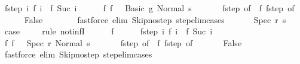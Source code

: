 \begin{isabellebody}
\ f{\isacharunderscore}step{\isacharcolon}\ {\isachardoublequoteopen}{\isasymAnd}i{\isachardot}\ {\isasymGamma}{\isasymturnstile}f\ i\ {\isasymrightarrow}\ f\ {\isacharparenleft}Suc\ i{\isacharparenright}{\isachardoublequoteclose}\isanewline
\ \ \ \ \isamarkupfalse%
\ f{\isacharunderscore}{}{\isacharcolon}\ {\isachardoublequoteopen}f\ {}\ {\isacharequal}\ {\isacharparenleft}Basic\ g{\isacharcomma}\ Normal\ s{\isacharparenright}{\isachardoublequoteclose}\ \isanewline
\ \ \ \ \isamarkupfalse%
\ f{\isacharunderscore}step\ {\isacharbrackleft}of\ {}{\isacharbrackright}\ f{\isacharunderscore}{}\ f{\isacharunderscore}step\ {\isacharbrackleft}of\ {}{\isacharbrackright}\isanewline
\ \ \ \ \isamarkupfalse%
\ False\isanewline
\ \ \ \ \ \ \isamarkupfalse%
\ {\isacharparenleft}fastforce\ elim{\isacharcolon}\ Skip{\isacharunderscore}no{\isacharunderscore}step\ step{\isacharunderscore}elim{\isacharunderscore}cases{\isacharparenright}\isanewline
\ \ \isamarkupfalse%
\isanewline
{}\isamarkupfalse%
\isanewline
\ \ \isamarkupfalse%
\ {\isacharparenleft}Spec\ r\ s{\isacharparenright}\ \isanewline
\ \ \isamarkupfalse%
\ {\isacharquery}case\ \isanewline
\ \ \isamarkupfalse%
\ {\isacharparenleft}rule\ not{\isacharunderscore}infI{\isacharparenright}\isanewline
\ \ \ \ \isamarkupfalse%
\ f\isanewline
\ \ \ \ \isamarkupfalse%
\ f{\isacharunderscore}step{\isacharcolon}\ {\isachardoublequoteopen}{\isasymAnd}i{\isachardot}\ {\isasymGamma}{\isasymturnstile}f\ i\ {\isasymrightarrow}\ f\ {\isacharparenleft}Suc\ i{\isacharparenright}{\isachardoublequoteclose}\isanewline
\ \ \ \ \isamarkupfalse%
\ f{\isacharunderscore}{}{\isacharcolon}\ {\isachardoublequoteopen}f\ {}\ {\isacharequal}\ {\isacharparenleft}Spec\ r{\isacharcomma}\ Normal\ s{\isacharparenright}{\isachardoublequoteclose}\ \isanewline
\ \ \ \ \isamarkupfalse%
\ f{\isacharunderscore}step\ {\isacharbrackleft}of\ {}{\isacharbrackright}\ f{\isacharunderscore}{}\ f{\isacharunderscore}step\ {\isacharbrackleft}of\ {}{\isacharbrackright}\isanewline
\ \ \ \ \isamarkupfalse%
\ False\isanewline
\ \ \ \ \ \ \isamarkupfalse%
\ {\isacharparenleft}fastforce\ elim{\isacharcolon}\ Skip{\isacharunderscore}no{\isacharunderscore}step\ step{\isacharunderscore}elim{\isacharunderscore}cases{\isacharparenright}\isanewline

\end{isabellebody}
